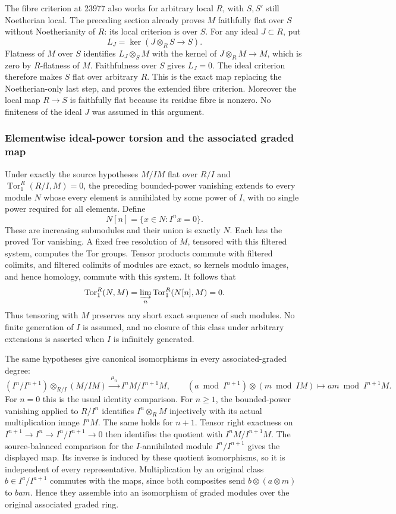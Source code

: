 The fibre criterion at 23977 also works for arbitrary local \(R\), with \(S,S'\) still Noetherian local. The preceding section already proves \(M\) faithfully flat over \(S\) without Noetherianity of \(R\): its local criterion is over \(S\). For any ideal \(J\subset R\), put \[
L_J=\ker(J\otimes_RS\to S).
\] Flatness of \(M\) over \(S\) identifies \(L_J\otimes_SM\) with the kernel of \(J\otimes_RM\to M\), which is zero by \(R\)-flatness of \(M\). Faithfulness over \(S\) gives \(L_J=0\). The ideal criterion therefore makes \(S\) flat over arbitrary \(R\). This is the exact map replacing the Noetherian-only last step, and proves the extended fibre criterion. Moreover the local map \(R\to S\) is faithfully flat because its residue fibre is nonzero. No finiteness of the ideal \(J\) was assumed in this argument.

\subsubsection{Elementwise ideal-power torsion and the associated graded map}\label{algebra-proof-016-elementwise-ideal-power-torsion-and-the-associated-graded-map}

Under exactly the source hypotheses \(M/IM\) flat over \(R/I\) and \(\operatorname{Tor}_1^R(R/I,M)=0\), the preceding bounded-power vanishing extends to every module \(N\) whose every element is annihilated by some power of \(I\), with no single power required for all elements. Define \[
N[n]=\{x\in N:I^nx=0\}.
\] These are increasing submodules and their union is exactly \(N\). Each has the proved Tor vanishing. A fixed free resolution of \(M\), tensored with this filtered system, computes the Tor groups. Tensor products commute with filtered colimits, and filtered colimits of modules are exact, so kernels modulo images, and hence homology, commute with this system. It follows that \[
\operatorname{Tor}_1^R(N,M)=
 \varinjlim_n\operatorname{Tor}_1^R(N[n],M)=0.
\] Thus tensoring with \(M\) preserves any short exact sequence of such modules. No finite generation of \(I\) is assumed, and no closure of this class under arbitrary extensions is asserted when \(I\) is infinitely generated.

The same hypotheses give canonical isomorphisms in every associated-graded degree: \[
(I^n/I^{n+1})\otimes_{R/I}(M/IM)
 \xrightarrow{\;\mu_n\;} I^nM/I^{n+1}M,\qquad
(a\bmod I^{n+1})\otimes(m\bmod IM)\longmapsto am\bmod I^{n+1}M.
\] For \(n=0\) this is the usual identity comparison. For \(n\geq1\), the bounded-power vanishing applied to \(R/I^n\) identifies \(I^n\otimes_RM\) injectively with its actual multiplication image \(I^nM\). The same holds for \(n+1\). Tensor right exactness on \(I^{n+1}\to I^n\to I^n/I^{n+1}\to0\) then identifies the quotient with \(I^nM/I^{n+1}M\). The source-balanced comparison for the \(I\)-annihilated module \(I^n/I^{n+1}\) gives the displayed map. Its inverse is induced by these quotient isomorphisms, so it is independent of every representative. Multiplication by an original class \(b\in I^a/I^{a+1}\) commutes with the maps, since both composites send \(b\otimes(a\otimes m)\) to \(bam\). Hence they assemble into an isomorphism of graded modules over the original associated graded ring.

